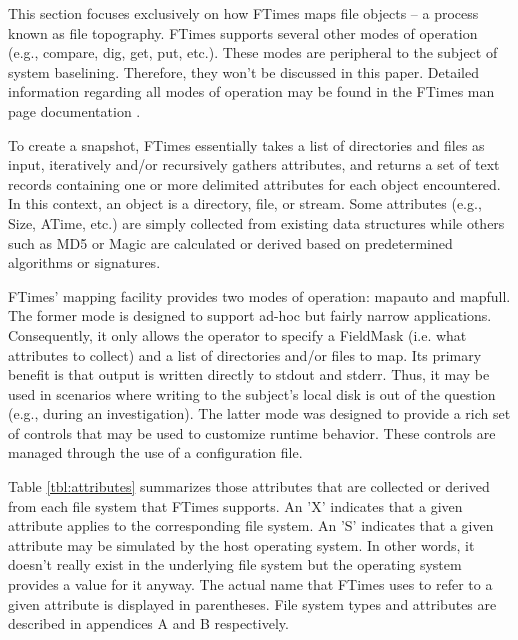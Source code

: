 \documentclass[10pt]{article}
\begin{document}
This section focuses exclusively on how FTimes maps file objects
-- a process known as file topography.  FTimes supports several
other modes of operation (e.g., compare, dig, get, put, etc.).
These modes are peripheral to the subject of system baselining.
Therefore, they won't be discussed in this paper.  Detailed
information regarding all modes of operation may be found in the
FTimes man page documentation \cite{ftimes}.

To create a snapshot, FTimes essentially takes a list of directories
and files as input, iteratively and/or recursively gathers attributes,
and returns a set of text records containing one or more delimited
attributes for each object encountered.  In this context, an object
is a directory, file, or stream.  Some attributes (e.g., Size,
ATime, etc.) are simply collected from existing data structures
while others such as MD5 or Magic are calculated or derived based
on predetermined algorithms or signatures.

FTimes' mapping facility provides two modes of operation: mapauto
and mapfull.  The former mode is designed to support ad-hoc but
fairly narrow applications.  Consequently, it only allows the
operator to specify a FieldMask (i.e. what attributes to collect)
and a list of directories and/or files to map.  Its primary benefit
is that output is written directly to stdout and stderr.  Thus, it
may be used in scenarios where writing to the subject's local disk
is out of the question (e.g., during an investigation).  The latter
mode was designed to provide a rich set of controls that may be
used to customize runtime behavior.  These controls are managed
through the use of a configuration file.

Table \ref{tbl:attributes} summarizes those attributes that are
collected or derived from each file system that FTimes supports.
An 'X' indicates that a given attribute applies to the corresponding
file system.  An 'S' indicates that a given attribute may be
simulated by the host operating system.  In other words, it doesn't
really exist in the underlying file system but the operating system
provides a value for it anyway.  The actual name that FTimes uses
to refer to a given attribute is displayed in parentheses.  File
system types and attributes are described in appendices A and B
respectively.
\end{document}
